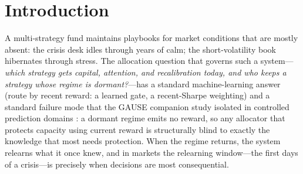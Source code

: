 \documentclass{article}
\begin{document}
\begin{abstract}
equal prominence: each walk-forward window is a single market history
(three independent market histories are now scored---US 1990--2025,
US 1926--1989, Japan---with the NBER labeler a second lodged test on
the first), the deficit's paying threshold is a
window, not a point---the lodged fine map finds windows on both
eras overlapping at $13$--$16\%$ under exit hysteresis, superseding
an earlier relocation reading (on the withheld era the window exists
only under exit hysteresis, and that era's lodged $10\%$ anchor
missed its sub-criterion; the committed window-location
estimator failed its first calibration, disclosed pre-CRSP and
retired),
aggregation itself can manufacture slow dynamics, and the
constituent-level CRSP test---its registration lodged with OSF
before any data access---remains the decider. All claims are
regret and retention claims, not alpha claims; code, data, and
per-figure result files are released.
\end{abstract}

\section{Introduction}

A multi-strategy fund maintains playbooks for market conditions that are
mostly absent: the crisis desk idles through years of calm; the
short-volatility book hibernates through stress. The allocation question that
governs such a system---\emph{which strategy gets capital, attention, and
recalibration today, and who keeps a strategy whose regime is dormant?}---has
a standard machine-learning answer (route by recent reward: a learned gate, a
recent-Sharpe weighting) and a standard failure mode that the GAUSE companion
study isolated in controlled prediction domains \citep{li2026gause}: a dormant
regime emits no reward, so any allocator that protects capacity using current
reward is structurally blind to exactly the knowledge that most needs
protection. When the regime returns, the system relearns what it once knew,
and in markets the relearning window---the first days of a crisis---is
precisely when decisions are most consequential.
\end{document}
